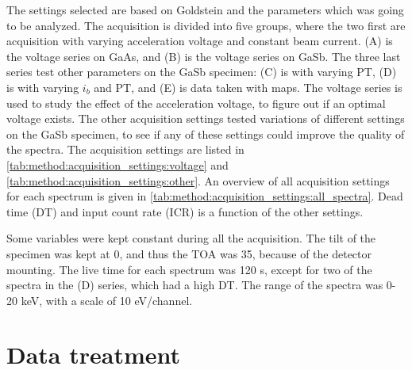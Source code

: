 The settings selected are based on Goldstein \cite{goldstein_scanning_2018} and the parameters which was going to be analyzed.
The acquisition is divided into five groups, where the two first are acquisition with varying acceleration voltage and constant beam current.
(A) is the voltage series on GaAs, and (B) is the voltage series on GaSb.
The three last series test other parameters on the GaSb specimen: (C) is with varying PT, (D) is with varying $i_b$ and PT, and (E) is data taken with maps.
The voltage series is used to study the effect of the acceleration voltage, to figure out if an optimal voltage exists.
The other acquisition settings tested variations of different settings on the GaSb specimen, to see if any of these settings could improve the quality of the spectra.
The acquisition settings are listed in \cref{tab:method:acquisition_settings:voltage} and \cref{tab:method:acquisition_settings:other}.
An overview of all acquisition settings for each spectrum is given in \cref{tab:method:acquisition_settings:all_spectra}.
Dead time (DT) and input count rate (ICR) is a function of the other settings.


Some variables were kept constant during all the acquisition.
The tilt of the specimen was kept at 0\textdegree, and thus the TOA was 35\textdegree, because of the detector mounting.
The live time for each spectrum was 120 s, except for two of the spectra in the (D) series, which had a high DT.
The range of the spectra was 0-20 keV, with a scale of 10 eV/channel.






































\section{Data treatment}
\label{method:data_treatment}

